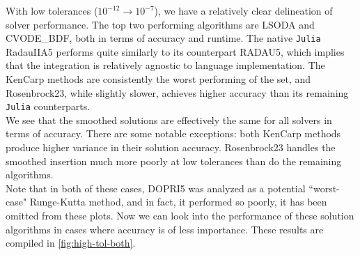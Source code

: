 \documentclass[review,onefignum,onetabnum]{siamart171218}
\begin{document}
With low tolerances ($10^{-12} \rightarrow 10^{-7}$), we have a relatively clear
delineation of solver performance. The top two performing algorithms are LSODA and
CVODE\_BDF, both in terms of accuracy and runtime. The native \texttt{Julia} RadauIIA5
performs quite similarly to its counterpart RADAU5, which implies that the integration
is relatively agnostic to language implementation. The KenCarp methods are consistently
the worst performing of the set, and Rosenbrock23, while slightly slower, achieves higher
accuracy than its remaining \texttt{Julia} counterparts.\\

We see that the smoothed solutions are effectively
the same for all solvers in terms of accuracy. There are some notable exceptions:
both KenCarp methods produce higher variance in their solution accuracy. Rosenbrock23
handles the smoothed insertion much more poorly at low tolerances than do the remaining
algorithms. \\

Note that in both of these cases, DOPRI5 was analyzed as a potential ``worst-case"
Runge-Kutta method, and in fact, it performed so poorly, it has been omitted from these
plots. Now we can look into the performance of these solution algorithms in cases where
accuracy is of less importance. These results are compiled in \cref{fig:high-tol-both}.\\
\end{document}
